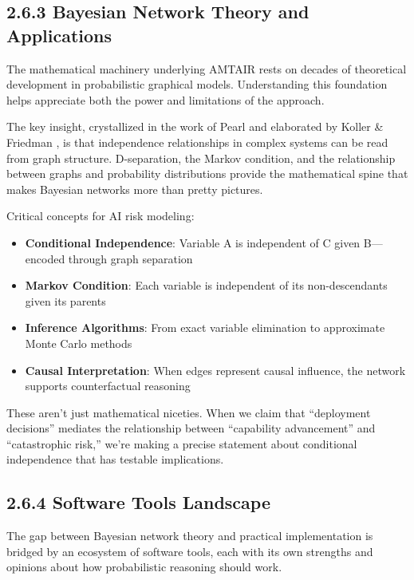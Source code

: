 \documentclass[
  11pt,
  letterpaper,
]{book}
\providecommand{\tightlist}{%
  \setlength{\itemsep}{0pt}\setlength{\parskip}{0pt}}
\begin{document}
\subsection{2.6.3 Bayesian Network Theory and
Applications}\label{sec-bn-theory}

The mathematical machinery underlying AMTAIR rests on decades of
theoretical development in probabilistic graphical models. Understanding
this foundation helps appreciate both the power and limitations of the
approach.

The key insight, crystallized in the work of Pearl \textcite{pearl2014}
and elaborated by Koller \& Friedman \textcite{koller2009}, is that
independence relationships in complex systems can be read from graph
structure. D-separation, the Markov condition, and the relationship
between graphs and probability distributions provide the mathematical
spine that makes Bayesian networks more than pretty pictures.

Critical concepts for AI risk modeling:

\begin{itemize}
\tightlist
\item
  \textbf{Conditional Independence}: Variable A is independent of C
  given B---encoded through graph separation
\item
  \textbf{Markov Condition}: Each variable is independent of its
  non-descendants given its parents
\item
  \textbf{Inference Algorithms}: From exact variable elimination to
  approximate Monte Carlo methods
\item
  \textbf{Causal Interpretation}: When edges represent causal influence,
  the network supports counterfactual reasoning
\end{itemize}

These aren't just mathematical niceties. When we claim that ``deployment
decisions'' mediates the relationship between ``capability advancement''
and ``catastrophic risk,'' we're making a precise statement about
conditional independence that has testable implications.

\subsection{2.6.4 Software Tools Landscape}\label{sec-software-tools}

The gap between Bayesian network theory and practical implementation is
bridged by an ecosystem of software tools, each with its own strengths
and opinions about how probabilistic reasoning should work.
\end{document}
